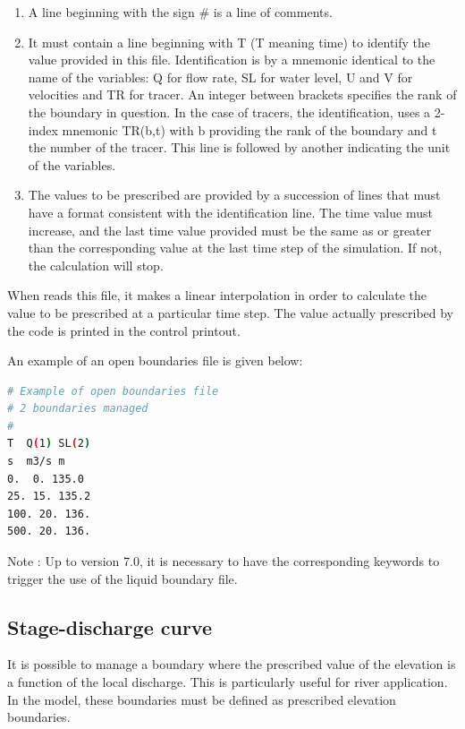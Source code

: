 \begin{enumerate}
\item  A line beginning with the sign \# is a line of comments.

\item  It must contain a line beginning with T (T meaning time) to identify the value provided in this file. Identification is by a mnemonic identical to the name of the variables: Q for flow rate, SL for water level, U and V for velocities and TR for tracer. An integer between brackets specifies the rank of the boundary in question. In the case of tracers, the identification, uses a 2-index mnemonic TR(b,t) with b providing the rank of the boundary and t the number of the tracer. This line is followed by another indicating the unit of the variables.

\item  The values to be prescribed are provided by a succession of lines that must have a format consistent with the identification line. The time value must increase, and the last time value provided must be the same as or greater than the corresponding value at the last time step of the simulation. If not, the calculation will stop.
\end{enumerate}

 When  reads this file, it makes a linear interpolation in order to calculate the value to be prescribed at a particular time step. The value actually prescribed by the code is printed in the control printout.

 An example of an open boundaries file is given below:
\begin{lstlisting}[language=bash]
# Example of open boundaries file
# 2 boundaries managed
#
T  Q(1) SL(2)
s  m3/s m
0.  0. 135.0
25. 15. 135.2
100. 20. 136.
500. 20. 136.
\end{lstlisting}
 \begin{WarningBlock}{Note :}
 Up to version 7.0, it is necessary to have the corresponding keywords  to trigger the use of the liquid boundary file.
\end{WarningBlock}

\subsection{  Stage-discharge curve}
\label{subs:stage:dis:curve}
 It is possible to manage a boundary where the prescribed value of the elevation is a function of the local discharge. This is particularly useful for river application. In the model, these boundaries must be defined as prescribed elevation boundaries.

